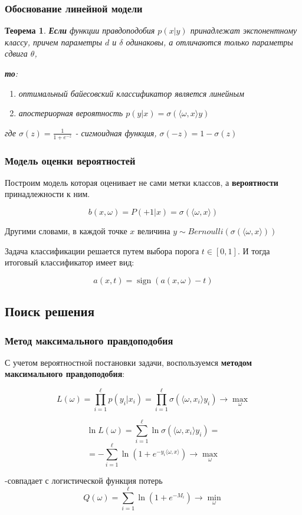 \documentclass{beamer}
\newtheorem{rustheorem}{Теорема}
\DeclareMathOperator{\sign}{sign}
\begin{document}
	\begin{frame}
		\frametitle{Обоснование линейной модели}
		
		\begin{rustheorem}
		\textbf{Если} функции правдоподобия $p(x | y) $ принадлежат экспонентному классу, причем параметры $d$ и $\delta$ одинаковы, а отличаются только параметры сдвига $\theta$, 
		
		\textbf{то}:
		\begin{enumerate}
			\item оптимальный байесовский классификатор является линейным%
			\item апостериорная вероятность $p(y | x) = \sigma(\langle \omega, x \rangle y)$
		\end{enumerate}
		
		где $\sigma(z) = \frac{1}{1 + e^{-z}}$ - сигмоидная функция, $\sigma(-z) = 1 - \sigma(z)$
		\end{rustheorem}	
	\end{frame}
	
	\begin{frame}
		\frametitle{Модель оценки вероятностей}
		Построим модель которая оценивает не сами метки классов, а \textbf{вероятности} принадлежности к ним.
		
		\[
		b(x, \omega) = P(+1 | x) = \sigma(\langle \omega, x \rangle)
		\]
		
		Другими словами, в каждой точке $x$ величина $y \sim Bernoulli(\sigma(\langle \omega, x \rangle))$
		
		\vspace{15pt}
		
		Задача классификации решается путем выбора порога $t \in [0, 1]$. И тогда итоговый классификатор имеет вид:
		
		\[
		a(x, t) = \sign (a(x, \omega) - t)
		\]
		
	\end{frame}
	
	\subsection{Поиск решения}
	
	\begin{frame}
		\frametitle{Метод максимального правдоподобия}
		С учетом вероятностной постановки задачи, воспользуемся \textbf{методом максимального правдоподобия}:
		
		\[
		L(\omega) = \prod_{i=1}^{\ell} p(y_i | x_i) = 
		\prod_{i=1}^{\ell} \sigma(\langle \omega, x_i \rangle y_i)
		\rightarrow \max_{\omega}
		\]
		
		\[
		\ln L(\omega) 
		= \sum_{i=1}^{\ell} \ln \sigma(\langle \omega, x_i \rangle y_i)
		=
		\]
		\[
		= 
		- \sum_{i=1}^{\ell} \ln(1 + e^{-y_i \langle \omega, x \rangle}) \rightarrow \max_{\omega}
		\]
		
		-совпадает с логистической функция потерь 
		\[
		Q(\omega) = \sum_{i=1}^{\ell} \ln (1 + e^{-M_i}) \rightarrow \min_{\omega}
		\]
	\end{frame}
	
\end{document}
